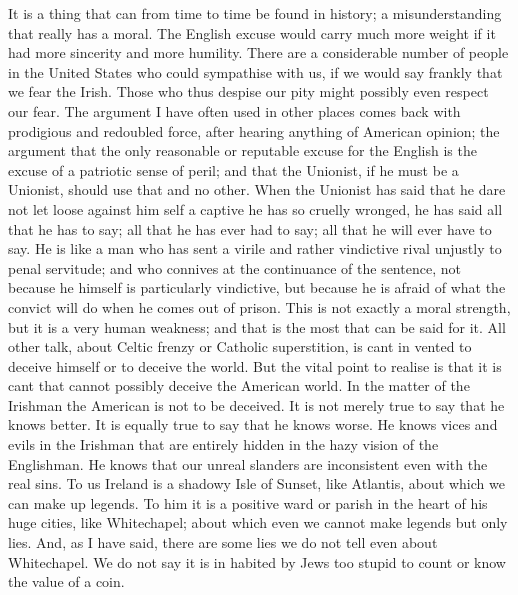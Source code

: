 \documentclass{book}
\begin{document}
It is a thing that can from time to time be found in history; a misunderstanding that really has a moral. The English excuse would carry much more weight if it had more sincerity and more humility. There are a considerable number of people in the United States who could sympathise with us, if we would say frankly that we fear the Irish. Those who thus despise our pity might possibly even respect our fear. The argument I have often used in other places comes back with prodigious and redoubled force, after hearing anything of American opinion; the argument that the only reasonable or reputable excuse for the English is the excuse of a patriotic sense of peril; and that the Unionist, if he must be a Unionist, should use that and no other. When the Unionist has said that he dare not let loose against him self a captive he has so cruelly wronged, he has said all that he has to say; all that he has ever had to say; all that he will ever have to say. He is like a man who has sent a virile and rather vindictive rival unjustly to penal servitude; and who connives at the continuance of the sentence, not because he himself is particularly vindictive, but because he is afraid of what the convict will do when he comes out of prison. This is not exactly a moral strength, but it is a very human weakness; and that is the most that can be said for it. All other talk, about Celtic frenzy or Catholic superstition, is cant in vented to deceive himself or to deceive the world. But the vital point to realise is that it is cant that cannot possibly deceive the American world. In the matter of the Irishman the American is not to be deceived. It is not merely true to say that he knows better. It is equally true to say that he knows worse. He knows vices and evils in the Irishman that are entirely hidden in the hazy vision of the Englishman. He knows that our unreal slanders are inconsistent even with the real sins. To us Ireland is a shadowy Isle of Sunset, like Atlantis, about which we can make up legends. To him it is a positive ward or parish in the heart of his huge cities, like Whitechapel; about which even we cannot make legends but only lies. And, as I have said, there are some lies we do not tell even about Whitechapel. We do not say it is in habited by Jews too stupid to count or know the value of a coin.
\end{document}
